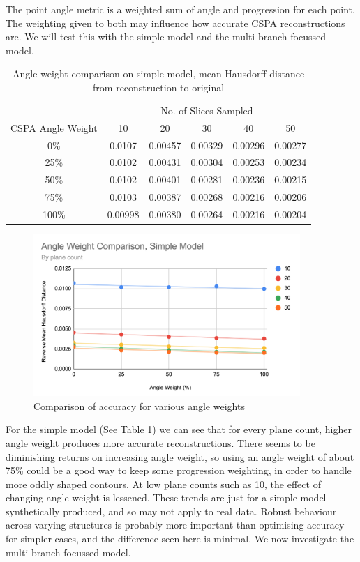 \documentclass[11p, titlepage]{article}
\begin{document}
The point angle metric is a weighted sum of angle and progression for each point. The weighting given to both may influence how accurate CSPA reconstructions are. We will test this with the simple model and the multi-branch focussed model.

\begin{table}[h!]
\begin{tabular}{ | c | c | c | c | c | c | }
\hline
& \multicolumn{5}{c|}{No. of Slices Sampled} \\
\cline{2-6}
CSPA Angle Weight & 10 & 20 & 30 & 40 & 50 \\
\hline
0\% & 0.0107 & 0.00457 & 0.00329 & 0.00296 & 0.00277 \\
25\% & 0.0102 & 0.00431 & 0.00304 & 0.00253 & 0.00234 \\
50\% & 0.0102 & 0.00401 & 0.00281 & 0.00236 & 0.00215 \\
75\% & 0.0103 & 0.00387 & 0.00268 & 0.00216 & 0.00206 \\
100\% & 0.00998 & 0.00380 & 0.00264 & 0.00216 & 0.00204 \\
\hline
\end{tabular}
\caption{Angle weight comparison on simple model, mean Hausdorff distance from reconstruction to original}
\label{table:ang_weight_simple_reverse}
\end{table}

\begin{figure}[h!]
\centering
\includegraphics[width=0.9\textwidth]{graphs/ang_weight_simple_reverse}
\caption{Comparison of accuracy for various angle weights\label{fig:ang_weight_simple_reverse}}
\end{figure}
\FloatBarrier

For the simple model (See Table \ref{table:ang_weight_simple_reverse}) we can see that for every plane count, higher angle weight produces more accurate reconstructions. There seems to be diminishing returns on increasing angle weight, so using an angle weight of about 75\% could be a good way to keep some progression weighting, in order to handle more oddly shaped contours. At low plane counts such as 10, the effect of changing angle weight is lessened. These trends are just for a simple model synthetically produced, and so may not apply to real data. Robust behaviour across varying structures is probably more important than optimising accuracy for simpler cases, and the difference seen here is minimal. We now investigate the multi-branch focussed model.
\end{document}
